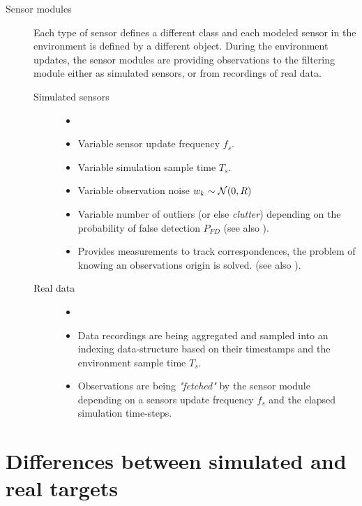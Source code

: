 \begin{description}
	\item[Sensor modules] Each type of sensor defines a different class and each modeled sensor in the environment is defined by a different object. During the environment updates, the sensor modules are providing observations to the filtering module either as simulated sensors, or from recordings of real data.
	\begin{description}
		\item[Simulated sensors]
		\begin{itemize}
			\item[]
			\item Variable sensor update frequency $f_s$.
			\item Variable simulation sample time $T_s$.
			\item Variable observation noise  ${w}_k \sim \mathcal{N}(0, {R})$
			\item Variable number of outliers (or else \emph{clutter}) depending on the probability of false detection $P_{FD}$ (see also ).
			\item Provides measurements to track correspondences, \ie the problem of knowing an observations origin is solved. (see also ).
		\end{itemize}
		\item[Real data]
				\begin{itemize}
					\item[]
					\item Data recordings are being aggregated and sampled into an indexing data-structure based on their timestamps and the environment sample time $T_s$.
					\item Observations are being \textit{"fetched"} by the sensor module depending on a sensors update frequency $f_s$ and the elapsed simulation time-steps.
				\end{itemize}
		
	\end{description}
\end{description}

	
	
\section{Differences between simulated and real targets}


